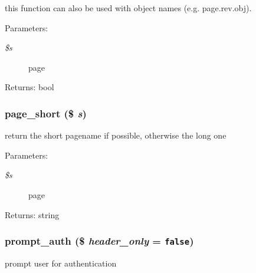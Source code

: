 this function can also be used with object names (e.g. page.rev.obj). \begin{Desc}
\item[Parameters:]
\begin{description}
\item[{\em \$s}]page \end{description}
\end{Desc}
\begin{Desc}
\item[Returns:]bool \end{Desc}
\hypertarget{common_8inc_8php_da968adfb989aa09adaf29867208f1ab}{
\subsubsection[{page\_\-short}]{\setlength{\rightskip}{0pt plus 5cm}page\_\-short (\$ {\em s})}}
\label{common_8inc_8php_da968adfb989aa09adaf29867208f1ab}


return the short pagename if possible, otherwise the long one

\begin{Desc}
\item[Parameters:]
\begin{description}
\item[{\em \$s}]page \end{description}
\end{Desc}
\begin{Desc}
\item[Returns:]string \end{Desc}
\hypertarget{common_8inc_8php_80c23c9d8ac02159151d6368506b1b54}{
\subsubsection[{prompt\_\-auth}]{\setlength{\rightskip}{0pt plus 5cm}prompt\_\-auth (\$ {\em header\_\-only} = {\tt false})}}
\label{common_8inc_8php_80c23c9d8ac02159151d6368506b1b54}


prompt user for authentication

